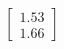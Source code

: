 \documentclass[preview]{standalone}
\begin{document}
\begin{align*}
\begin{bmatrix} 1.53 \\ 1.66 \end{bmatrix}
\end{align*}
\end{document}
